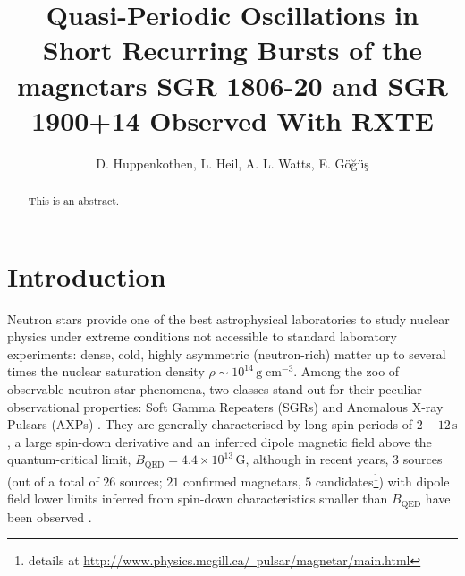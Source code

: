 \documentclass[numberedappendix]{emulateapj}
\begin{document}
\title{Quasi-Periodic Oscillations in Short Recurring Bursts of the magnetars SGR 1806-20 and SGR 1900+14 Observed With RXTE}

\author{D. Huppenkothen, L. Heil, A. L. Watts,  E. G{\"o}{\u g}{\"u}{\c s}}

 


\begin{abstract}
This is an abstract. 
\end{abstract}
\begin{abstract}
\end{abstract} 



\section{Introduction}

Neutron stars provide one of the best astrophysical laboratories to study nuclear physics under extreme conditions not accessible to standard laboratory experiments: dense, cold, highly asymmetric (neutron-rich) matter up to several times the nuclear saturation density $\rho \sim 10^{14} \, \mathrm{g}\; \mathrm{cm}^{-3}$.
Among the zoo of observable neutron star phenomena, two classes stand out for their peculiar observational properties: Soft Gamma Repeaters (SGRs) and Anomalous X-ray Pulsars (AXPs) \citep[both classes are also called {\it magnetars}; for a general overview, see ][]{woods2006,mereghetti2011}.
They are generally characterised by long spin periods of $2 - 12 \, \mathrm{s}$, a large spin-down derivative and an inferred dipole magnetic field above the quantum-critical limit, $B_{\mathrm{QED}} = 4.4 \times 10^{13} \, \mathrm{G}$, although in recent years, $3$ sources (out of a total of $26$ sources; $21$ confirmed magnetars, $5$ candidates\footnote{details at \hyperref[]{http://www.physics.mcgill.ca/~pulsar/magnetar/main.html}}) with dipole field lower limits inferred from spin-down characteristics smaller than $B_{\mathrm{QED}}$ have been observed \citep{vanderhorst2010,esposito2010,rea2010,rea2012,scholz2012,rea2014}. 
\end{document}
